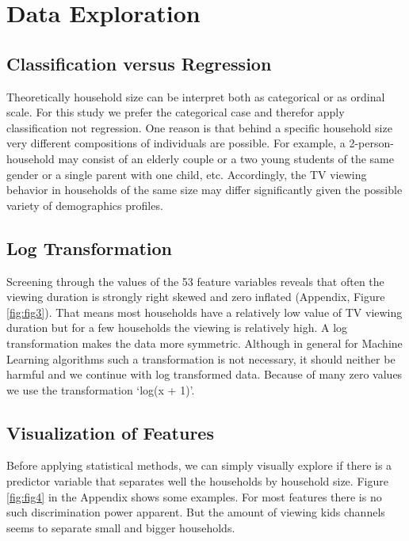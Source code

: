 \documentclass[]{article}
\begin{document}
\hypertarget{data-exploration}{%
\section{Data Exploration}\label{data-exploration}}

\hypertarget{classification-versus-regression}{%
\subsection{Classification versus
Regression}\label{classification-versus-regression}}

Theoretically household size can be interpret both as categorical or as
ordinal scale. For this study we prefer the categorical case and
therefor apply classification not regression. One reason is that behind
a specific household size very different compositions of individuals are
possible. For example, a 2-person-household may consist of an elderly
couple or a two young students of the same gender or a single parent
with one child, etc. Accordingly, the TV viewing behavior in households
of the same size may differ significantly given the possible variety of
demographics profiles.

\hypertarget{log-transformation}{%
\subsection{Log Transformation}\label{log-transformation}}

Screening through the values of the 53 feature variables reveals that
often the viewing duration is strongly right skewed and zero inflated
(Appendix, Figure \ref{fig:fig3}). That means most households have a
relatively low value of TV viewing duration but for a few households the
viewing is relatively high. A log transformation makes the data more
symmetric. Although in general for Machine Learning algorithms such a
transformation is not necessary, it should neither be harmful and we
continue with log transformed data. Because of many zero values we use
the transformation `log(x + 1)'.

\hypertarget{visualization-of-features}{%
\subsection{Visualization of Features}\label{visualization-of-features}}

Before applying statistical methods, we can simply visually explore if
there is a predictor variable that separates well the households by
household size. Figure \ref{fig:fig4} in the Appendix shows some
examples. For most features there is no such discrimination power
apparent. But the amount of viewing kids channels seems to separate
small and bigger households.
\end{document}

